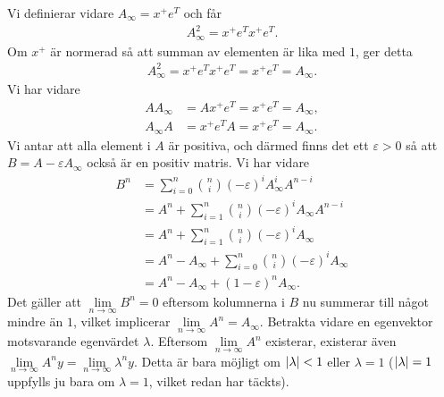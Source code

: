 Vi definierar vidare $A_{\infty} = x^{+}e^{T}$ och får
\begin{align*}
	A_{\infty}^{2} = x^{+}e^{T}x^{+}e^{T}.
\end{align*}
Om $x^{+}$ är normerad så att summan av elementen är lika med $1$, ger detta
\begin{align*}
	A_{\infty}^{2} = x^{+}e^{T}x^{+}e^{T} = x^{+}e^{T} = A_{\infty}.
\end{align*}
Vi har vidare
\begin{align*}
	AA_{\infty} &= Ax^{+}e^{T} = x^{+}e^{T} = A_{\infty}, \\
	A_{\infty}A &= x^{+}e^{T}A = x^{+}e^{T} = A_{\infty}.
\end{align*}
Vi antar att alla element i $A$ är positiva, och därmed finns det ett $\varepsilon > 0$ så att $B = A - \varepsilon A_{\infty}$ också är en positiv matris. Vi har vidare
\begin{align*}
	B^{n} &= \sum\limits_{i = 0}^{n}{n\choose i}(-\varepsilon)^{i}A_{\infty}^{i}A^{n - i} \\
	      &= A^{n} + \sum\limits_{i = 1}^{n}{n\choose i}(-\varepsilon)^{i}A_{\infty}A^{n - i} \\
	      &= A^{n} + \sum\limits_{i = 1}^{n}{n\choose i}(-\varepsilon)^{i}A_{\infty} \\
	      &= A^{n} - A_{\infty} + \sum\limits_{i = 0}^{n}{n\choose i}(-\varepsilon)^{i} A_{\infty} \\
	      &= A^{n} - A_{\infty} + (1 - \varepsilon)^{n}A_{\infty}.
\end{align*}
Det gäller att $\lim\limits_{n\to\infty}B^{n} = 0$ eftersom kolumnerna i $B$ nu summerar till något mindre än $1$, vilket implicerar $\lim\limits_{n\to\infty}A^{n} = A_{\infty}$. Betrakta vidare en egenvektor motsvarande egenvärdet $\lambda$. Eftersom $\lim\limits_{n\to\infty}A^{n}$ existerar, existerar även $\lim\limits_{n\to\infty}A^{n}y = \lim\limits_{n\to\infty}\lambda^{n}y$. Detta är bara möjligt om $\abs{\lambda} < 1$ eller $\lambda = 1$ ($\abs{\lambda} = 1$ uppfylls ju bara om $\lambda = 1$, vilket redan har täckts).